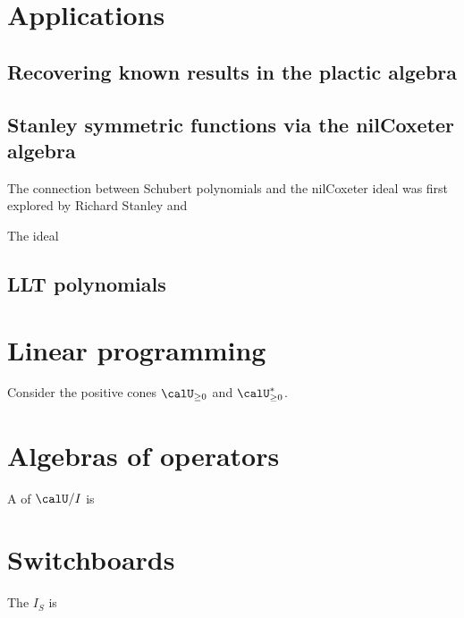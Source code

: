 \documentclass{article}
\begin{document}
\section{Applications}

\subsection{Recovering known results in the plactic algebra}

\subsection{Stanley symmetric functions via the nilCoxeter algebra}

The connection between Schubert polynomials and the nilCoxeter ideal was first explored by Richard Stanley and 

\begin{definition}
    The  ideal
\end{definition}

\subsection{LLT polynomials}




\section{Linear programming}

Consider the positive cones $\calU_{\geq 0}$ and $\calU^\ast_{\geq 0}$.


\section{Algebras of operators}

\begin{definition}
    A  of $\calU/I$ is
\end{definition}

\section{Switchboards}

\begin{definition}
    The  $I_S$ is
\end{definition}
\end{document}
